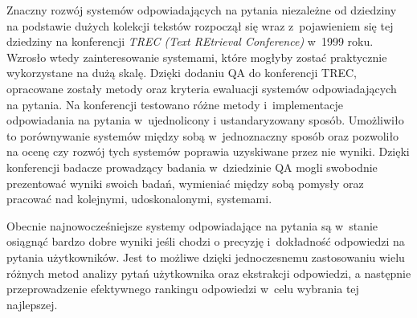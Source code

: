 \documentclass[a4paper, twoside, openright, 12pt]{report}
\begin{document}
            Znaczny rozwój systemów odpowiadających na pytania niezależne od dziedziny na podstawie dużych kolekcji
            tekstów rozpoczął się wraz z~pojawieniem się tej dziedziny na konferencji \emph{TREC (Text REtrieval Conference)}
            w~1999 roku.
            Wzrosło wtedy zainteresowanie systemami, które mogłyby zostać praktycznie wykorzystane na dużą skalę. Dzięki
            dodaniu QA do konferencji TREC, opracowane zostały metody oraz kryteria ewaluacji systemów odpowiadających
            na pytania. Na konferencji testowano różne metody i~implementacje odpowiadania na pytania w~ujednolicony i
            ustandaryzowany sposób. Umożliwiło to porównywanie systemów między sobą w~jednoznaczny sposób oraz pozwoliło na ocenę
            czy rozwój tych systemów poprawia uzyskiwane przez nie wyniki. Dzięki konferencji badacze prowadzący badania
            w~dziedzinie QA mogli swobodnie prezentować wyniki swoich badań, wymieniać między sobą pomysły oraz pracować
            nad kolejnymi, udoskonalonymi, systemami.

            Obecnie najnowocześniejsze systemy odpowiadające na pytania są w~stanie osiągnąć bardzo dobre wyniki jeśli
            chodzi o precyzję i~dokładność odpowiedzi na pytania użytkowników. Jest to możliwe dzięki jednoczesnemu zastosowaniu
            wielu różnych metod analizy pytań użytkownika oraz ekstrakcji odpowiedzi, a następnie przeprowadzenie efektywnego
            rankingu odpowiedzi w~celu wybrania tej najlepszej.
\end{document}
